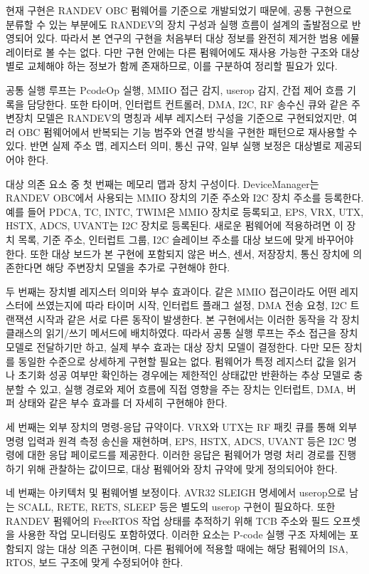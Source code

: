 \documentclass[master,korean,final]{kaist-ucs}
\begin{document}
현재 구현은 RANDEV OBC 펌웨어를 기준으로 개발되었기 때문에, 공통 구현으로 분류할 수 있는 부분에도 RANDEV의 장치 구성과 실행 흐름이 설계의 출발점으로 반영되어 있다. 따라서 본 연구의 구현을 처음부터 대상 정보를 완전히 제거한 범용 에뮬레이터로 볼 수는 없다. 다만 구현 안에는 다른 펌웨어에도 재사용 가능한 구조와 대상별로 교체해야 하는 정보가 함께 존재하므로, 이를 구분하여 정리할 필요가 있다.

공통 실행 루프는 PcodeOp 실행, MMIO 접근 감지, userop 감지, 간접 제어 흐름 기록을 담당한다. 또한 타이머, 인터럽트 컨트롤러, DMA, I2C, RF 송수신 큐와 같은 주변장치 모델은 RANDEV의 명칭과 세부 레지스터 구성을 기준으로 구현되었지만, 여러 OBC 펌웨어에서 반복되는 기능 범주와 연결 방식을 구현한 패턴으로 재사용할 수 있다. 반면 실제 주소 맵, 레지스터 의미, 통신 규약, 일부 실행 보정은 대상별로 제공되어야 한다.

대상 의존 요소 중 첫 번째는 메모리 맵과 장치 구성이다. DeviceManager는 RANDEV OBC에서 사용되는 MMIO 장치의 기준 주소와 I2C 장치 주소를 등록한다. 예를 들어 PDCA, TC, INTC, TWIM은 MMIO 장치로 등록되고, EPS, VRX, UTX, HSTX, ADCS, UVANT는 I2C 장치로 등록된다. 새로운 펌웨어에 적용하려면 이 장치 목록, 기준 주소, 인터럽트 그룹, I2C 슬레이브 주소를 대상 보드에 맞게 바꾸어야 한다. 또한 대상 보드가 본 구현에 포함되지 않은 버스, 센서, 저장장치, 통신 장치에 의존한다면 해당 주변장치 모델을 추가로 구현해야 한다.

두 번째는 장치별 레지스터 의미와 부수 효과이다. 같은 MMIO 접근이라도 어떤 레지스터에 쓰였는지에 따라 타이머 시작, 인터럽트 플래그 설정, DMA 전송 요청, I2C 트랜잭션 시작과 같은 서로 다른 동작이 발생한다. 본 구현에서는 이러한 동작을 각 장치 클래스의 읽기/쓰기 메서드에 배치하였다. 따라서 공통 실행 루프는 주소 접근을 장치 모델로 전달하기만 하고, 실제 부수 효과는 대상 장치 모델이 결정한다. 다만 모든 장치를 동일한 수준으로 상세하게 구현할 필요는 없다. 펌웨어가 특정 레지스터 값을 읽거나 초기화 성공 여부만 확인하는 경우에는 제한적인 상태값만 반환하는 추상 모델로 충분할 수 있고, 실행 경로와 제어 흐름에 직접 영향을 주는 장치는 인터럽트, DMA, 버퍼 상태와 같은 부수 효과를 더 자세히 구현해야 한다.

세 번째는 외부 장치의 명령-응답 규약이다. VRX와 UTX는 RF 패킷 큐를 통해 외부 명령 입력과 원격 측정 송신을 재현하며, EPS, HSTX, ADCS, UVANT 등은 I2C 명령에 대한 응답 페이로드를 제공한다. 이러한 응답은 펌웨어가 명령 처리 경로를 진행하기 위해 관찰하는 값이므로, 대상 펌웨어와 장치 규약에 맞게 정의되어야 한다.

네 번째는 아키텍처 및 펌웨어별 보정이다. AVR32 SLEIGH 명세에서 userop으로 남는 SCALL, RETE, RETS, SLEEP 등은 별도의 userop 구현이 필요하다. 또한 RANDEV 펌웨어의 FreeRTOS 작업 상태를 추적하기 위해 TCB 주소와 필드 오프셋을 사용한 작업 모니터링도 포함하였다. 이러한 요소는 P-code 실행 구조 자체에는 포함되지 않는 대상 의존 구현이며, 다른 펌웨어에 적용할 때에는 해당 펌웨어의 ISA, RTOS, 보드 구조에 맞게 수정되어야 한다.
\end{document}
